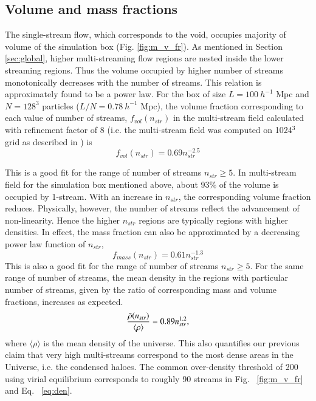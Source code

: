 \subsection{Volume and mass fractions}

The single-stream flow, which corresponds to the void, occupies majority of volume of the simulation box (Fig. \ref{fig:m_v_fr}). As mentioned in Section \ref{sec:global}, higher multi-streaming flow regions are nested inside the lower streaming regions. Thus the volume occupied by higher number of streams monotonically decreases with the number of streams. This relation is approximately found to be a power law. For the box of size $L =100 ~h^{-1}$ Mpc and $N = 128^3$ particles ($L/N = 0.78 ~h^{-1}$ Mpc), the volume fraction corresponding to each value of number of streams, $ f_{vol}(n_{str})$ in the multi-stream field calculated with refinement factor of 8 (i.e. the multi-stream field
was computed on 1024$^3$ grid as described in \cite{Shandarin2012}) is 
\begin{equation}
\label{eq:fr_vol}
f_{vol}(n_{str}) =  0.69 n_{str}^{-2.5}
\end{equation}


This is a good fit for the range of number of streams $n_{str} \ge 5 $. In multi-stream field for the simulation box mentioned above, about 93$\%$ of the volume is occupied by 1-stream. With an increase in $n_{str}$, the corresponding volume fraction reduces. Physically, however, the number of streams reflect the advancement of non-linearity. Hence the higher $n_{str}$ regions are typically regions with higher densities. In effect, the mass fraction can also be approximated by a decreasing power law function of $n_{str}$,  
\begin{equation}
\label{eq:fr_mass}
f_{mass}(n_{str}) = 0.61 n_{str}^{-1.3}
\end{equation}
This is also a good fit for the range of number of streams $n_{str} \ge 5 $. For the same range of number of streams, the mean density in the regions with particular number of streams, given by the  ratio of corresponding mass and volume fractions, increases as expected.
\begin{equation}
\label{eq:den}
{\bar{\rho}(n_{str}) \over \langle{\rho}\rangle} = 0.89  n_{str}^{1.2} ,
\end{equation}
where $\langle\rho\rangle$ is the mean density of the universe.
This also quantifies our previous claim that very high multi-streams correspond to the most dense areas in the Universe, i.e. the condensed haloes. The common over-density threshold of 200 using virial equilibrium corresponds to roughly 90 streams in  Fig. ~\ref{fig:m_v_fr} and Eq. ~\ref{eq:den}.

